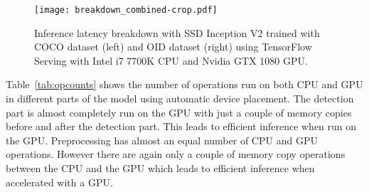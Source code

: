 \documentclass[sigconf]{acmart}
\begin{document}
\begin{figure}[t]
\centering
\texttt{[image: breakdown\_combined-crop.pdf]}
\caption{Inference latency breakdown with SSD Inception V2 trained with COCO dataset (left) and OID dataset (right) using TensorFlow Serving with Intel i7 7700K CPU and Nvidia GTX 1080 GPU.}
\label{fig:breakdown}
\end{figure}

Table~\ref{tab:opcounts} shows the number of operations run on both CPU and GPU in different parts of the model using automatic device placement. The detection part is almost completely run on the GPU with just a couple of memory copies before and after the detection part. This leads to efficient inference when run on the GPU. Preprocessing has almost an equal number of CPU and GPU operations. However there are again only a couple of memory copy operations between the CPU and the GPU which leads to efficient inference when accelerated with a GPU.

\begin{table}[]
\centering
\caption{Device placement and memory copy counts for SSD Inception V2 with automatic placement using TensorFlow. (H=Host, D=Device}
\label{tab:opcounts}
\end{table}
\end{document}
